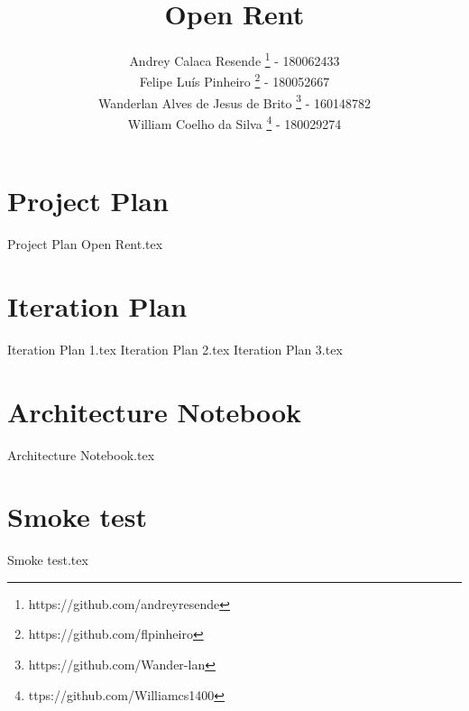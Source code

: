 \documentclass[a4paper,11pt]{book}
\title{Open Rent}
\author{
    Andrey Calaca Resende \footnote{https://github.com/andreyresende} - 180062433\\
    Felipe Luís Pinheiro \footnote{https://github.com/flpinheiro} - 180052667 \\
    Wanderlan Alves de Jesus de Brito \footnote{https://github.com/Wander-lan} - 160148782\\
    William Coelho da Silva \footnote{ttps://github.com/Williamcs1400} - 180029274

}
\date{}
\begin{document}
\maketitle

\tableofcontents

\chapter{Project Plan}
{Project Plan Open Rent.tex}

\chapter{Iteration Plan}
{Iteration Plan 1.tex}
{Iteration Plan 2.tex}
{Iteration Plan 3.tex}

\chapter{Architecture Notebook}
{Architecture Notebook.tex}

\chapter{Smoke test}
{Smoke test.tex}
\end{document}
